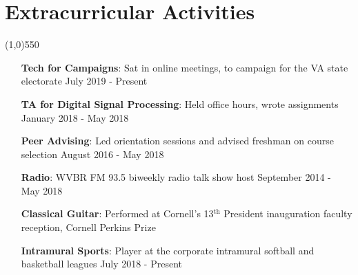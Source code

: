 \documentclass[11pt]{article} %
\begin{document}
	\section*{Extracurricular Activities}
	\vspace{-7ex}
	\begin{center}
    \line(1,0){550}
    \end{center}
    \vspace{-3ex}
	\begin{itemize}
		\item[\textbf{Tech for Campaigns}:] Sat in online meetings, to campaign for the VA state electorate \hfill July 2019 - Present 
		\item[\textbf{TA for Digital Signal Processing}:] Held office hours, wrote assignments \hfill January 2018 - May 2018 
	    \item[\textbf{Peer Advising}:] Led orientation sessions and advised freshman on course selection \hfill August 2016 - May 2018 
		\item[\textbf{Radio}:] WVBR FM 93.5 biweekly radio talk show host \hfill September 2014 - May 2018 
		\item[\textbf{Classical Guitar}:] Performed at Cornell's 13$^\textrm{th}$ President inauguration faculty reception, Cornell Perkins Prize 
		\item[\textbf{Intramural Sports}:] Player at the corporate intramural softball and basketball leagues \hfill July 2018 - Present
	\end{itemize}
	
\end{document}
